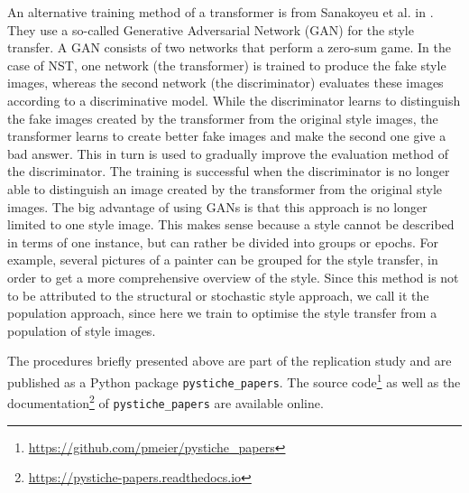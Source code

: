 An alternative training method of a transformer is from Sanakoyeu et al. in \cite{SKLO2018}. They use a so-called Generative Adversarial Network (GAN) for the style transfer. A GAN consists of two networks that perform a zero-sum game. In the case of NST, one network (the transformer) is trained to produce the fake style images, whereas the second network (the discriminator) evaluates these images according to a discriminative model. While the discriminator learns to distinguish the fake images created by the transformer from the original style images, the transformer learns to create better fake images and make the second one give a bad answer. This in turn is used to gradually improve the evaluation method of the discriminator. The training is successful when the discriminator is no longer able to distinguish an image created by the transformer from the original style images. The big advantage of using GANs is that this approach is no longer limited to one style image. This makes sense because a style cannot be described in terms of one instance, but can rather be divided into groups or epochs. For example, several pictures of a painter can be grouped for the style transfer, in order to get a more comprehensive overview of the style. Since this method is not to be attributed to the structural or stochastic style approach, we call it the population approach, since here we train to optimise the style transfer from a population of style images.

The procedures briefly presented above are part of the replication study and are published as a Python package \texttt{pystiche\_papers}. The source code\footnote{\url{https://github.com/pmeier/pystiche_papers}} as well as the documentation\footnote{\url{https://pystiche-papers.readthedocs.io}} of \texttt{pystiche\_papers} are available online. 